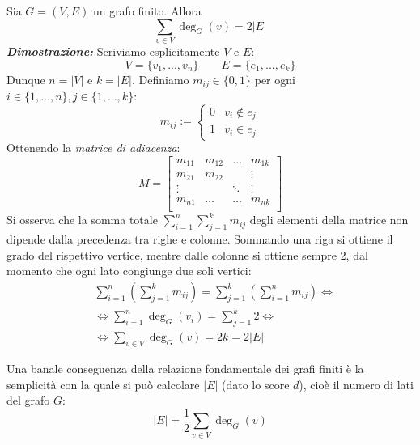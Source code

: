\begin{tcolorbox}[title={Relazione fondamentale dei grafi finiti}]
Sia $G=(V,E)$ un grafo finito. Allora
\[ \sum_{v\in V} \deg_G(v) = 2|E| \]
\textit{\textbf{Dimostrazione:}} Scriviamo esplicitamente $V$ e $E$:
\[ V=\{v_1,...,v_n\} \qquad E=\{e_1,...,e_k\} \]
Dunque $n=|V|$ e $k=|E|$. Definiamo $m_{ij} \in \{0,1\}$ per ogni
$i \in \{1,...,n\}, j \in \{1,...,k\}$:
\[
    m_{ij} :=
    \begin{cases}
        0 & v_i \not \in e_j\\
        1 & v_i \in e_j
    \end{cases}
\]
Ottenendo la \textit{matrice di adiacenza}:
\[ 
    M =
    \begin{bmatrix}
        m_{11} & m_{12} & \dots  & m_{1k}\\
        m_{21} & m_{22} &        & \vdots\\
        \vdots &        & \ddots & \vdots\\
        m_{n1} & \dots  & \dots  & m_{nk}\\
    \end{bmatrix}
\]
Si osserva che la somma totale $\sum_{i=1}^{n}\sum_{j=1}^{k}m_{ij}$ degli elementi
della matrice non dipende dalla precedenza tra righe e colonne. Sommando
una riga si ottiene il grado del rispettivo vertice, mentre dalle
colonne si ottiene sempre 2, dal momento che ogni lato congiunge due
soli vertici:
\begin{align*}
    &\sum_{i=1}^{n}\left(\sum_{j=1}^{k}m_{ij}\right) = \sum_{j=1}^{k}\left(\sum_{i=1}^{n}m_{ij}\right)\Leftrightarrow\\
    &\Leftrightarrow \sum_{i=1}^{n}\deg_G(v_i) = \sum_{j=1}^{k}2\Leftrightarrow\\
    &\Leftrightarrow \sum_{v\in V}\deg_G(v)=2k=2|E|
\end{align*}
\cvd
\end{tcolorbox}

\begin{osservaz}
Una banale conseguenza della relazione fondamentale dei grafi finiti è
la semplicità con la quale si può calcolare $|E|$ (dato lo score $d$), cioè
il numero di lati del grafo $G$:
\[ |E| = \frac{1}{2}\sum_{v\in V}\deg_G(v) \]
\end{osservaz}

